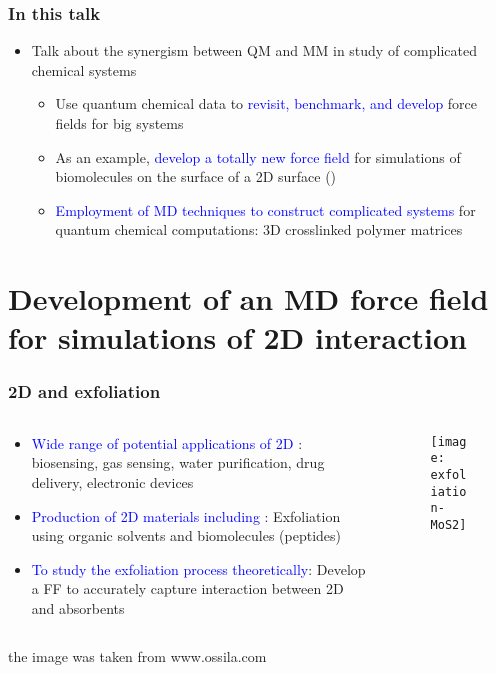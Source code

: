 \documentclass[xcolor=table,aspectratio=169]{beamer}
\begin{document}
\begin{frame}
	\frametitle{In this talk}

	\begin{itemize}
		\item Talk about the synergism between QM and MM in study of complicated chemical systems
		      \begin{itemize}
			      \item Use quantum chemical data to \textcolor{blue}{revisit, benchmark, and develop} force fields for big systems
			      \item As an example, \textcolor{blue}{develop a totally new force field} for simulations of biomolecules on the surface of a 2D surface ()
			      \item \textcolor{blue}{Employment of MD techniques to construct complicated systems} for quantum chemical computations: 3D crosslinked polymer matrices
		      \end{itemize}
	\end{itemize}

\end{frame}


\section[Development of an MD force field]{Development of an MD force field for simulations of 2D  interaction}


\begin{frame}
	\frametitle{2D  and exfoliation}
	\begin{columns}
		\begin{column}{0.7\textwidth}
			\begin{itemize}
				\item \textcolor{blue}{Wide range of potential applications of 2D }: biosensing, gas sensing, water purification, drug delivery, electronic devices
				\item \textcolor{blue}{Production of 2D materials including }: Exfoliation using organic solvents and biomolecules (peptides)
				\item \textcolor{blue}{To study the exfoliation process theoretically}: Develop a FF to accurately capture interaction between 2D  and absorbents
			\end{itemize}
		\end{column}
		\begin{column}{0.4\textwidth}
			\begin{figure}
				\centering
				\texttt{[image: exfoliation-MoS2]}
			\end{figure}
		\end{column}
	\end{columns}
	\hfill \tiny{the image was taken from www.ossila.com}
\end{frame}
\end{document}
